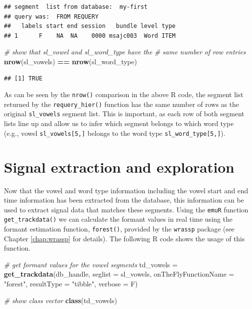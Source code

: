 \documentclass[]{book}
\newenvironment{Shaded}{\begin{snugshade}}{\end{snugshade}}
\newcommand{\CommentTok}[1]{\textcolor[rgb]{0.56,0.35,0.01}{\textit{#1}}}
\newcommand{\DataTypeTok}[1]{\textcolor[rgb]{0.13,0.29,0.53}{#1}}
\newcommand{\KeywordTok}[1]{\textcolor[rgb]{0.13,0.29,0.53}{\textbf{#1}}}
\newcommand{\NormalTok}[1]{#1}
\newcommand{\OperatorTok}[1]{\textcolor[rgb]{0.81,0.36,0.00}{\textbf{#1}}}
\newcommand{\StringTok}[1]{\textcolor[rgb]{0.31,0.60,0.02}{#1}}
\theoremstyle{definition}
\theoremstyle{definition}
\theoremstyle{definition}
\theoremstyle{remark}
\begin{document}
\begin{verbatim}
## segment  list from database:  my-first 
## query was:  FROM REQUERY 
##   labels start end session   bundle level type
## 1      F    NA  NA    0000 msajc003  Word ITEM
\end{verbatim}

\begin{Shaded}
\begin{Highlighting}[]
\CommentTok{# show that sl_vowel and sl_word_type have the}
\CommentTok{# same number of row entries}
\KeywordTok{nrow}\NormalTok{(sl_vowels) }\OperatorTok{==}\StringTok{ }\KeywordTok{nrow}\NormalTok{(sl_word_type)}
\end{Highlighting}
\end{Shaded}

\begin{verbatim}
## [1] TRUE
\end{verbatim}

As can be seen by the \texttt{nrow()} comparison in the above R code,
the segment list returned by the \texttt{requery\_hier()} function has
the same number of rows as the original \texttt{sl\_vowels} segment
list. This is important, as each row of both segment lists line up and
allow us to infer which segment belongs to which word type (e.g., vowel
\texttt{sl\_vowels{[}5,{]}} belongs to the word type
\texttt{sl\_word\_type{[}5,{]}}).

\hypertarget{section:tutorial-sigExtrAndExpl}{%
\section{Signal extraction and
exploration}\label{section:tutorial-sigExtrAndExpl}}

Now that the vowel and word type information including the vowel start
and end time information has been extracted from the database, this
information can be used to extract signal data that matches these
segments. Using the \texttt{emuR} function \texttt{get\_trackdata()} we
can calculate the formant values in real time using the formant
estimation function, \texttt{forest()}, provided by the \texttt{wrassp}
package (see Chapter \ref{chap:wrassp} for details). The following R
code shows the usage of this function.

\begin{Shaded}
\begin{Highlighting}[]
\CommentTok{# get formant values for the vowel segments}
\NormalTok{td_vowels =}\StringTok{ }\KeywordTok{get_trackdata}\NormalTok{(db_handle,}
                          \DataTypeTok{seglist =}\NormalTok{ sl_vowels,}
                          \DataTypeTok{onTheFlyFunctionName =} \StringTok{"forest"}\NormalTok{,}
                          \DataTypeTok{resultType =} \StringTok{"tibble"}\NormalTok{,}
                          \DataTypeTok{verbose =}\NormalTok{ F)}

\CommentTok{# show class vector}
\KeywordTok{class}\NormalTok{(td_vowels)}
\end{Highlighting}
\end{Shaded}
\end{document}
